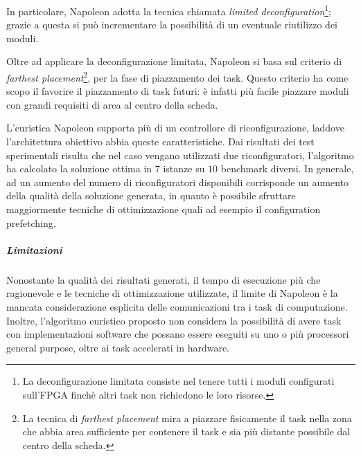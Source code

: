 In particolare, Napoleon adotta la tecnica chiamata \emph{limited 
deconfiguration}\footnote{La deconfigurazione limitata consiste nel tenere 
tutti i moduli configurati sull'\ac{FPGA} finchè altri task non richiedono le 
loro risorse.}; grazie a questa si può incrementare la possibilità di 
un eventuale riutilizzo dei moduli.

Oltre ad applicare la deconfigurazione limitata, Napoleon si basa sul criterio 
di \emph{farthest placement}\footnote{La tecnica di \emph{farthest placement} 
mira a piazzare fisicamente il task nella zona che abbia area sufficiente per 
contenere il task e sia più distante possibile dal centro della scheda.}, per 
la fase di piazzamento dei task. Questo criterio ha come scopo il favorire il 
piazzamento di task futuri: è infatti più facile piazzare moduli con grandi 
requisiti di area al centro della scheda.

L'euristica Napoleon supporta più di un controllore di riconfigurazione, 
laddove l'architettura obiettivo abbia queste caratteristiche. Dai risultati 
dei test sperimentali risulta che nel caso vengano utilizzati due 
riconfiguratori, l'algoritmo ha calcolato la soluzione ottima in $7$ istanze su 
$10$ benchmark diversi. In generale, ad un aumento del numero di 
riconfiguratori disponibili corrisponde un aumento della qualità della 
soluzione generata, in quanto è possibile sfruttare maggiormente tecniche di 
ottimizzazione quali ad esempio il configuration prefetching.

\subparagraph{Limitazioni}
Nonostante la qualità dei risultati generati, il tempo di esecuzione più che 
ragionevole e le tecniche di ottimizzazione utilizzate, il limite di Napoleon è 
la mancata considerazione esplicita delle comunicazioni tra i task di 
computazione. Inoltre, l'algoritmo euristico proposto non considera la 
possibilità di avere task con implementazioni software che possano essere 
eseguiti su uno o più processori general purpose, oltre ai task accelerati in 
hardware.



